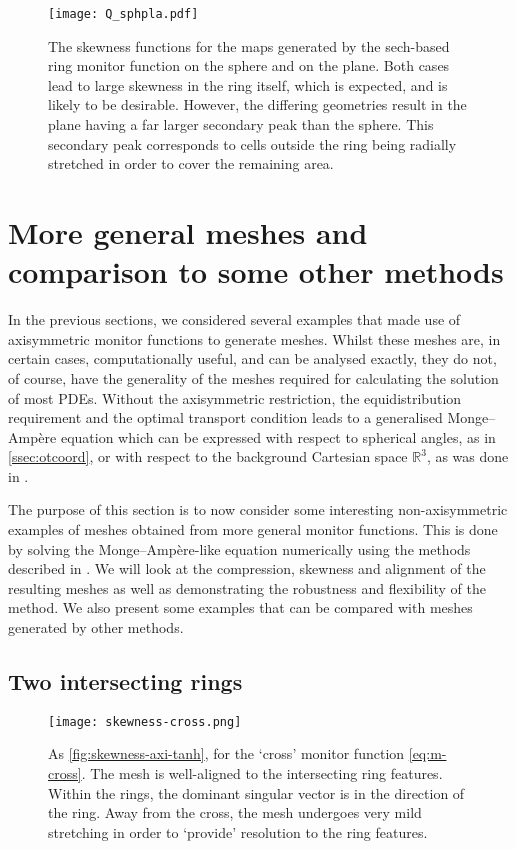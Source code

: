 \documentclass[11pt, a4paper]{scrartcl}  %
\theoremstyle{plain}
\theoremstyle{definition}
\numberwithin{equation}{section}
\begin{document}
\begin{figure}[!tb]
  \centering
  \texttt{[image: Q\_sphpla.pdf]}
  \caption{The skewness functions for the maps generated by the
sech-based ring monitor function on the sphere and on the plane. Both
cases lead to large skewness in the ring itself, which is expected, and
is likely to be desirable. However, the differing geometries result in
the plane having a far larger secondary peak than the sphere. This
secondary peak corresponds to cells outside the ring being radially
stretched in order to cover the remaining area.}
\label{fig:Q_sphpla}
\end{figure}

\section{More general meshes and comparison to some other methods}
\label{sec:numnonaxi}

In the previous sections, we considered several examples that made use
of axisymmetric monitor functions to generate meshes. Whilst these
meshes are, in certain cases, computationally useful, and can be
analysed exactly, they do not, of course, have the generality of the
meshes required for calculating the solution of most PDEs.  Without the
axisymmetric restriction, the equidistribution requirement and the
optimal transport condition leads to a generalised Monge--Ampère
equation which can be expressed with respect to spherical angles, as in
\cref{ssec:otcoord}, or with respect to the background Cartesian space
$\mathbb{R}^3$, as was done in \citet{mcrae2018optimal}.

The purpose of this section is to now consider some interesting
non-axisymmetric examples of meshes obtained from more general monitor
functions. This is done by solving the Monge--Ampère-like equation
numerically using the methods described in \citet{mcrae2018optimal}. We
will look at the compression, skewness and alignment of the resulting
meshes as well as demonstrating the robustness and flexibility of the
method. We also present some examples that can be compared with meshes
generated by other methods.

\subsection{Two intersecting rings}

\begin{figure}[!tb]
  \centering
  \texttt{[image: skewness-cross.png]}
  \caption{As \cref{fig:skewness-axi-tanh}, for the `cross' monitor
function \cref{eq:m-cross}. The mesh is well-aligned to the intersecting
ring features. Within the rings, the dominant singular vector is in the
direction of the ring. Away from the cross, the mesh undergoes very mild
stretching in order to `provide' resolution to the ring features.}
\label{fig:skewness-axi-cross}
\end{figure}
\end{document}
